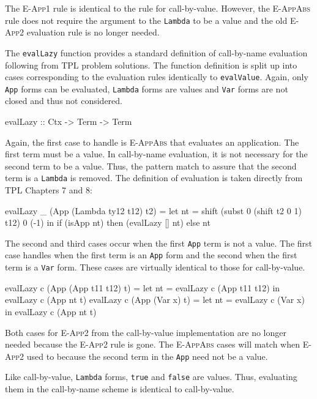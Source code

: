 \documentclass[10pt]{article}
\begin{document}
The \textsc{E-App1} rule is identical to the rule for call-by-value.
However, the \textsc{E-AppAbs} rule does not require the argument to
the \texttt{Lambda} to be a value and the old \textsc{E-App2}
evaluation rule is no longer needed.

The \texttt{evalLazy} function provides a standard definition of
call-by-name evaluation following from TPL problem solutions.  The
function definition is split up into cases corresponding to the
evaluation rules identically to \texttt{evalValue}.  Again, only
\texttt{App} forms can be evaluated, \texttt{Lambda} forms are values
and \texttt{Var} forms are not closed and thus not considered.

\begin{code}
  evalLazy :: Ctx -> Term -> Term
\end{code}

Again, the first case to handle is \textsc{E-AppAbs} that evaluates an
application.  The first term must be a value.  In call-by-name
evaluation, it is not necessary for the second term to be a value.
Thus, the pattern match to assure that the second term is a
\texttt{Lambda} is removed.  The definition of evaluation is taken
directly from TPL Chapters 7 and 8:

\begin{code}
  evalLazy _ (App (Lambda ty12 t12) t2) =
     let nt = shift (subst 0 (shift t2 0 1) t12) 0 (-1) in
         if (isApp nt) then (evalLazy [] nt) else nt
\end{code}

The second and third cases occur when the first \texttt{App} term is
not a value.  The first case handles when the first term is an
\texttt{App} form and the second when the first term is a \texttt{Var}
form.  These cases are virtually identical to those for call-by-value.

\begin{code}
  evalLazy c (App (App t11 t12) t) =
      let nt = evalLazy c (App t11 t12) in evalLazy c (App nt t)
  evalLazy c (App (Var x) t) = 
      let nt = evalLazy c (Var x) in evalLazy c (App nt t)
\end{code}

Both cases for \textsc{E-App2} from the call-by-value implementation
are no longer needed because the \textsc{E-App2} rule is gone.  The
\textsc{E-AppAbs} cases will match when \textsc{E-App2} used to
because the second term in the \texttt{App} need not be a value.

Like call-by-value, \texttt{Lambda} forms, \texttt{true} and
\texttt{false} are values.  Thus, evaluating them in the call-by-name
scheme is identical to call-by-value.
\end{document}
